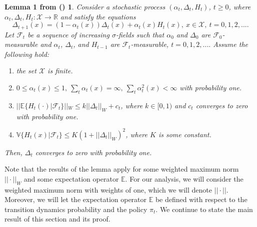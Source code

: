 \newtheorem*{lemma1*}{Lemma 1 from \citeauthor{Singh2000} (\citeyear{Singh2000})}
\begin{lemma1*}
Consider a stochastic process $(\alpha_t, \Delta_t, H_t)$, $t \geq 0$, where $\alpha_t, \Delta_t, H_t: \mathcal{X} \rightarrow \mathbb{R}$ and satisfy the equations 
\begin{equation}
\label{eq:lemma1_update}
\Delta_{t+1} (x) = (1-\alpha_t(x)) \Delta_t (x) + \alpha_t (x) H_t (x), \ x \in \mathcal{X}, \ t= 0,1,2,....
\end{equation}
%
Let $\mathcal{F}_t$ be a sequence of increasing $\sigma$-fields such that $\alpha_0$ and $\Delta_0$ are $\mathcal{F}_0$-measurable and $\alpha_t$, $\Delta_t$, and $H_{t-1}$ are $\mathcal{F}_t$-measurable, $t=0,1,2,....$
Assume the following hold:
\begin{enumerate}
\item the set $\mathcal{X}$ is finite.
\item $0 \leq \alpha_t (x) \leq 1, \ \sum_t \alpha_t(x) = \infty, \ \sum_t \alpha^2_t(x) < \infty$ with probability one. 
\item $|| \mathbb{E} \{ H_t( \cdot ) | \mathcal{F}_t \} ||_W \leq k || \Delta_t ||_W + c_t$, where $k \in [0, 1)$ and $c_t$ converges to zero with probability one. 
\item $\mathbb{V}\{H_t(x) | \mathcal{F}_t \} \leq K(1 + || \Delta_t ||_W)^2$, where $K$ is some constant.
\end{enumerate}
Then, $\Delta_t$ converges to zero with probability one.
\end{lemma1*}

Note that the results of the lemma apply for some weighted maximum norm $|| \cdot ||_W$ and some expectation operator $\mathbb{E}$.
For our analysis, we will consider the weighted maximum norm with weights of one, which we will denote $|| \cdot ||$.
Moreover, we will let the expectation operator $\mathbb{E}$ be defined with respect to the transition dynamics probability and the policy $\pi_t$.
We continue to state the main result of this section and its proof.

